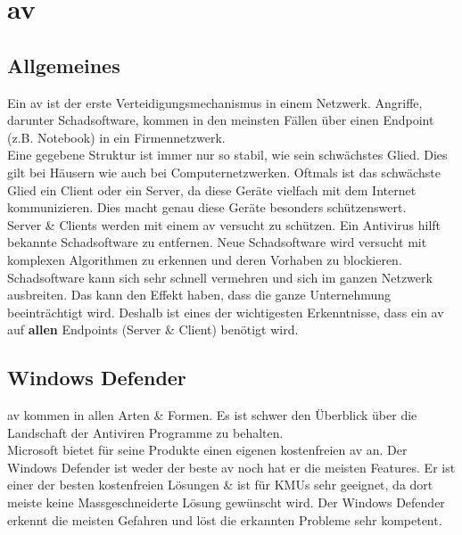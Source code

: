 \chapter{\acrlong{av}}
\section{Allgemeines} %
Ein \acrfull{av} ist der erste Verteidigungsmechanismus in einem Netzwerk. Angriffe, darunter Schadsoftware, kommen in den meinsten Fällen über einen Endpoint (z.B. Notebook) in ein Firmennetzwerk.\\

Eine gegebene Struktur ist immer nur so stabil, wie sein schwächstes Glied. Dies gilt bei Häusern wie auch bei Computernetzwerken.
Oftmals ist das schwächste Glied ein Client oder ein Server, da diese Geräte vielfach mit dem Internet kommunizieren.
Dies macht genau diese Geräte besonders schützenswert.\\

Server \& Clients werden mit einem \acrlong{av} versucht zu schützen. Ein Antivirus hilft bekannte Schadsoftware zu entfernen.
Neue Schadsoftware wird versucht mit komplexen Algorithmen zu erkennen und deren Vorhaben zu blockieren.
Schadsoftware kann sich sehr schnell vermehren und sich im ganzen Netzwerk ausbreiten. 
Das kann den Effekt haben, dass die ganze Unternehmung beeinträchtigt wird.
Deshalb ist eines der wichtigesten Erkenntnisse, dass ein \acrlong{av} auf \textbf{allen} Endpoints (Server \& Client) benötigt wird.





\section{Windows Defender}
\acrfull{av} kommen in allen Arten \& Formen.
Es ist schwer den Überblick über die Landschaft der Antiviren Programme zu behalten.\\


Microsoft bietet für seine Produkte einen eigenen kostenfreien \acrlong{av} an.
Der Windows Defender ist weder der beste \acrshort{av} noch hat er die meisten Features.
Er ist einer der besten kostenfreien Lösungen \& ist für KMUs sehr geeignet, da dort meiste keine Massgeschneiderte Lösung gewünscht wird.
Der Windows Defender erkennt die meisten Gefahren und löst die erkannten Probleme sehr kompetent.\\


